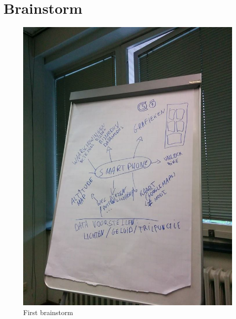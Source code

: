 \section{Brainstorm}
\begin{figure}[H]
\center
 \includegraphics[width=\linewidth]{brainstorm/brainstorm1.jpg}
 \caption{First brainstorm}
 \label{image:ganttchart}
\end{figure}
